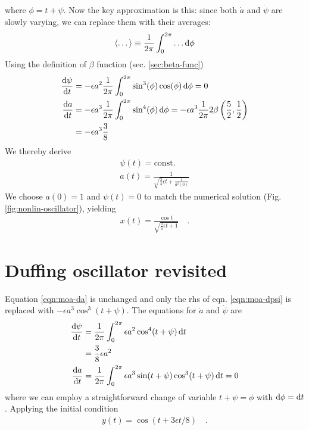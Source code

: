 where $\phi = t+\psi$. Now the key approximation is this:  since both $\dot{a}$ and $\dot{\psi}$ are slowly varying, we can replace them with their averages:
\begin{gather*}
	\langle \dots \rangle \equiv \frac{1}{2\pi} \int_{0}^{2 \pi} \dots \mathrm{d} \phi 
\end{gather*}
Using the definition of $\beta$ function (sec. \ref{sec:beta-func})
\begin{align*}
\frac{\mathrm{d} \psi}{\mathrm{d} t} &= -\epsilon a^2 \frac{1}{2\pi} \int_{0}^{2 \pi}\sin^3 (\phi) \cos (\phi) \, \mathrm{d} \phi = 0\\
\frac{\mathrm{d} a}{\mathrm{d} t} &= -\epsilon a^3 \frac{1}{2\pi} \int_{0}^{2\pi} \sin^4(\phi) \, \mathrm{d} \phi = -\epsilon a^3 \frac{1}{2\pi} 2 \beta \left(\frac{5}{2},\frac{1}{2}\right) \\
&= -\epsilon a^3 \frac{3}{8}
\end{align*}
We thereby derive
\begin{gather*}
	\psi(t) = \mathrm{const.} \\
	a(t) = \frac{1}{\sqrt{\frac{3}{4}\epsilon t + \frac{1}{a^2(0)}}} 
\end{gather*}
We choose $a(0)=1$ and $\psi(t)=0$ to match the numerical solution (Fig. \ref{fig:nonlin-oscillator}), yielding
\begin{gather}\label{eqn:moa-ana-soln}
	x(t) = \frac{\cos t}{\sqrt{\frac{3}{4}\epsilon t + 1}} \quad .
\end{gather}

\section*{Duffing oscillator revisited}\label{sec:moa-duffing}
Equation \ref{eqn:moa-da} is unchanged and only the rhs of eqn. \ref{eqn:moa-dpsi} is replaced with $-\epsilon a^3 \cos^3(t+\psi)$. The equations for $\dot{a}$ and $\dot{\psi}$ are
\begin{align*}
	\frac{\mathrm{d} \psi}{\mathrm{d} t} &= \frac{1}{2\pi} \int_{0}^{2\pi} \epsilon a^2 \cos^4 (t+\psi) \, \mathrm{d} t\\
	&=\frac{3}{8} \epsilon a^2 \\
	\frac{\mathrm{d} a}{\mathrm{d} t} &= \frac{1}{2\pi}\int_{0}^{2\pi}\epsilon a^3 \sin(t+\psi) \cos^3(t+\psi) \, \mathrm{d} t = 0
\end{align*}
where we can employ a straightforward change of variable $t+\psi = \phi$ with $\mathrm{d} \phi = \mathrm{d} t$. Applying the initial condition 
\begin{gather*}
	y(t) = \cos \left(t + 3 \epsilon t / 8\right) \quad .
\end{gather*}




